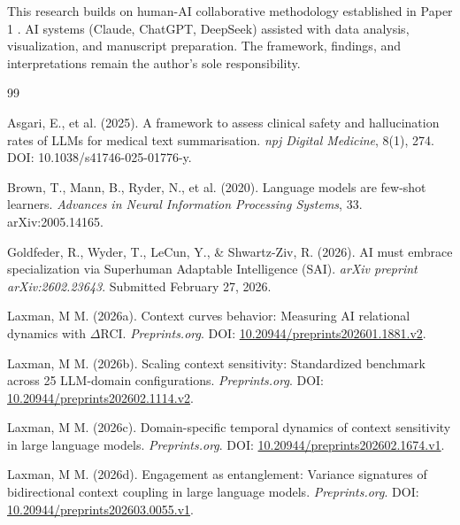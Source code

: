 \documentclass[11pt,a4paper]{article}
\begin{document}
This research builds on human-AI collaborative methodology established in Paper 1 \citep{laxman2026paper1}. AI systems (Claude, ChatGPT, DeepSeek) assisted with data analysis, visualization, and manuscript preparation. The framework, findings, and interpretations remain the author's sole responsibility.


\begin{thebibliography}{99}

Asgari, E., et al. (2025).
\newblock A framework to assess clinical safety and hallucination rates of LLMs for medical text summarisation.
\newblock \emph{npj Digital Medicine}, 8(1), 274.
\newblock DOI: 10.1038/s41746-025-01776-y.

Brown, T., Mann, B., Ryder, N., et al. (2020).
\newblock Language models are few-shot learners.
\newblock \emph{Advances in Neural Information Processing Systems}, 33.
\newblock arXiv:2005.14165.

Goldfeder, R., Wyder, T., LeCun, Y., \& Shwartz-Ziv, R. (2026).
\newblock AI must embrace specialization via Superhuman Adaptable Intelligence (SAI).
\newblock \emph{arXiv preprint arXiv:2602.23643}. Submitted February 27, 2026.

Laxman, M M. (2026a).
\newblock Context curves behavior: Measuring AI relational dynamics with $\Delta$RCI.
\newblock \emph{Preprints.org}.
\newblock DOI: \href{https://doi.org/10.20944/preprints202601.1881.v2}{10.20944/preprints202601.1881.v2}.

Laxman, M M. (2026b).
\newblock Scaling context sensitivity: Standardized benchmark across 25 LLM-domain configurations.
\newblock \emph{Preprints.org}.
\newblock DOI: \href{https://doi.org/10.20944/preprints202602.1114.v2}{10.20944/preprints202602.1114.v2}.

Laxman, M M. (2026c).
\newblock Domain-specific temporal dynamics of context sensitivity in large language models.
\newblock \emph{Preprints.org}.
\newblock DOI: \href{https://doi.org/10.20944/preprints202602.1674.v1}{10.20944/preprints202602.1674.v1}.

Laxman, M M. (2026d).
\newblock Engagement as entanglement: Variance signatures of bidirectional context coupling in large language models.
\newblock \emph{Preprints.org}.
\newblock DOI: \href{https://doi.org/10.20944/preprints202603.0055.v1}{10.20944/preprints202603.0055.v1}.


\end{thebibliography}
\end{document}
